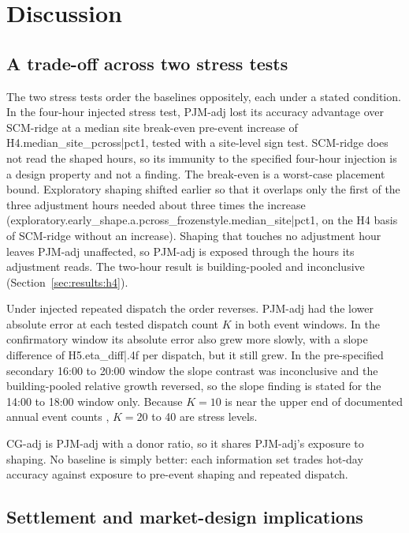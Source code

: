 \section{Discussion}\label{sec:discussion}

\subsection{A trade-off across two stress tests}\label{sec:discussion:tradeoff}

The two stress tests order the baselines oppositely, each under a stated condition. In the four-hour injected stress test, PJM-adj lost its accuracy advantage over SCM-ridge at a median site break-even pre-event increase of {{H4.median_site_pcross|pct1}}, tested with a site-level sign test. SCM-ridge does not read the shaped hours, so its immunity to the specified four-hour injection is a design property and not a finding. The break-even is a worst-case placement bound. Exploratory shaping shifted earlier so that it overlaps only the first of the three adjustment hours needed about three times the increase ({{exploratory.early_shape.a.pcross_frozenstyle.median_site|pct1}}, on the H4 basis of SCM-ridge without an increase). Shaping that touches no adjustment hour leaves PJM-adj unaffected, so PJM-adj is exposed through the hours its adjustment reads. The two-hour result is building-pooled and inconclusive (Section~\ref{sec:results:h4}).

Under injected repeated dispatch the order reverses. PJM-adj had the lower absolute error at each tested dispatch count $K$ in both event windows. In the confirmatory window its absolute error also grew more slowly, with a slope difference of {{H5.eta_diff|.4f}} per dispatch, but it still grew. In the pre-specified secondary 16:00 to 20:00 window the slope contrast was inconclusive and the building-pooled relative growth reversed, so the slope finding is stated for the 14:00 to 18:00 window only. Because $K=10$ is near the upper end of documented annual event counts \citep{kiliccote2010,nyiso2024dr}, $K=20$ to 40 are stress levels.

CG-adj is PJM-adj with a donor ratio, so it shares PJM-adj's exposure to shaping. No baseline is simply better: each information set trades hot-day accuracy against exposure to pre-event shaping and repeated dispatch.

\subsection{Settlement and market-design implications}\label{sec:discussion:design}

